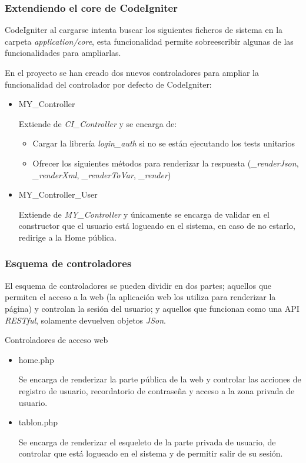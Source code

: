     \subsubsection{Extendiendo el core de CodeIgniter}

    CodeIgniter al cargarse intenta buscar los siguientes ficheros de sistema en la carpeta \emph{application/core}, esta funcionalidad permite sobreescribir algunas de las funcionalidades para ampliarlas.

    En el proyecto se han creado dos nuevos controladores para ampliar la funcionalidad del controlador por defecto de CodeIgniter:

    \begin{itemize}
        \item MY\_Controller

        Extiende de \emph{CI\_Controller} y se encarga de:

            \begin{itemize}
                \item Cargar la librería \emph{login\_auth} si no se están ejecutando los tests unitarios
                \item Ofrecer los siguientes métodos para renderizar la respuesta (\emph{\_renderJson}, \emph{\_renderXml}, \emph{\_renderToVar}, \emph{\_render})
            \end{itemize}

        \item MY\_Controller\_User

        Extiende de \emph{MY\_Controller} y únicamente se encarga de validar en el constructor que el usuario está logueado en el sistema, en caso de no estarlo, redirige a la Home pública.
    \end{itemize}

    \subsubsection{Esquema de controladores}

El esquema de controladores se pueden dividir en dos partes; aquellos que permiten el acceso a la web (la aplicación web los utiliza para renderizar la página) y controlan la sesión del usuario; y aquellos que funcionan como una API \emph{RESTful}, solamente devuelven objetos \emph{JSon}.

Controladores de acceso web

    \begin{itemize}
        \item home.php

            Se encarga de renderizar la parte pública de la web y controlar las acciones de registro de usuario, recordatorio de contraseña y acceso a la zona privada de usuario.

        \item tablon.php

            Se encarga de renderizar el esqueleto de la parte privada de usuario, de controlar que está logueado en el sistema y de permitir salir de su sesión.
    \end{itemize}

